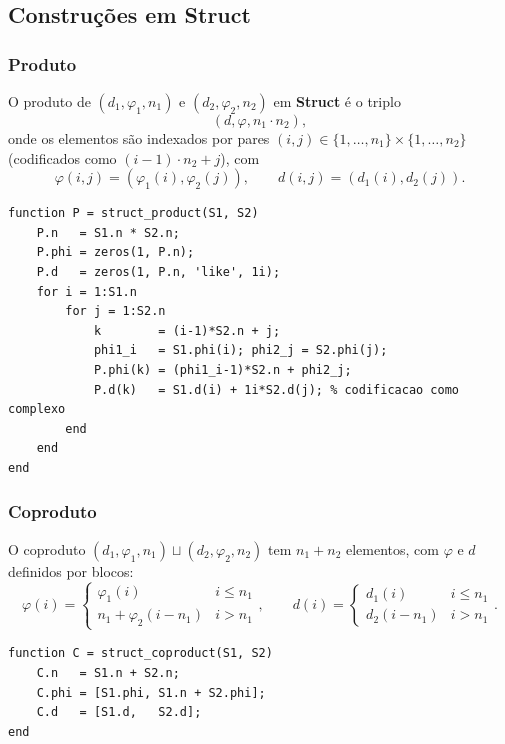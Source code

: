 \subsection{Construções em \textbf{Struct}}
\label{subsec:struct-constructions}

\subsubsection{Produto}

\begin{proposition}
O produto de $(d_1, \varphi_1, n_1)$ e $(d_2, \varphi_2, n_2)$ em \textbf{Struct} é o triplo
\[
    (d, \varphi, n_1 \cdot n_2),
\]
onde os elementos são indexados por pares $(i,j) \in \{1,\ldots,n_1\} \times \{1,\ldots,n_2\}$ (codificados como $(i-1)\cdot n_2 + j$), com
\[
    \varphi(i,j) = (\varphi_1(i), \varphi_2(j)), \qquad d(i,j) = (d_1(i), d_2(j)).
\]
\end{proposition}

\begin{lstlisting}[style=matlab, caption={Produto de dois objetos de Struct}]
function P = struct_product(S1, S2)
    P.n   = S1.n * S2.n;
    P.phi = zeros(1, P.n);
    P.d   = zeros(1, P.n, 'like', 1i);
    for i = 1:S1.n
        for j = 1:S2.n
            k        = (i-1)*S2.n + j;
            phi1_i   = S1.phi(i); phi2_j = S2.phi(j);
            P.phi(k) = (phi1_i-1)*S2.n + phi2_j;
            P.d(k)   = S1.d(i) + 1i*S2.d(j); % codificacao como complexo
        end
    end
end
\end{lstlisting}

\subsubsection{Coproduto}

O coproduto $(d_1, \varphi_1, n_1) \sqcup (d_2, \varphi_2, n_2)$ tem $n_1 + n_2$ elementos, com $\varphi$ e $d$ definidos por blocos:
\[
    \varphi(i) = \begin{cases} \varphi_1(i) & i \leq n_1 \\ n_1 + \varphi_2(i - n_1) & i > n_1 \end{cases}, \qquad
    d(i) = \begin{cases} d_1(i) & i \leq n_1 \\ d_2(i - n_1) & i > n_1 \end{cases}.
\]

\begin{lstlisting}[style=matlab, caption={Coproduto de dois objetos de Struct}]
function C = struct_coproduct(S1, S2)
    C.n   = S1.n + S2.n;
    C.phi = [S1.phi, S1.n + S2.phi];
    C.d   = [S1.d,   S2.d];
end
\end{lstlisting}

